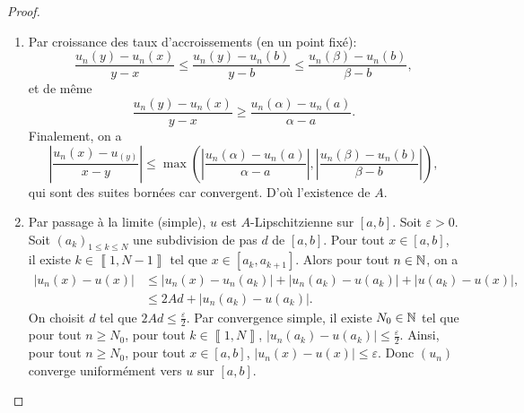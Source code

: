 \documentclass[12pt]{article}
\begin{document}
\begin{proof}
    \phantom{}
    \begin{enumerate}
        \item Par croissance des taux d'accroissements (en un point fixé):
        \begin{equation*}
            \frac{u_n(y)-u_n(x)}{y-x}\leqslant\frac{u_n(y)-u_n(b)}{y-b}\leqslant\frac{u_n(\beta)-u_n(b)}{\beta-b},
        \end{equation*}
        et de même
        \begin{equation*}
            \frac{u_n(y)-u_n(x)}{y-x}\geqslant\frac{u_n(\alpha)-u_n(a)}{\alpha-a}.
        \end{equation*}
        Finalement, on a 
        \begin{equation*}
            \left\lvert\frac{u_n(x)-u_(y)}{x-y}\right\rvert\leqslant\max\left(\left\lvert\frac{u_n(\alpha)-u_n(a)}{\alpha-a}\right\rvert,\left\lvert\frac{u_n(\beta)-u_n(b)}{\beta-b}\right\rvert\right),
        \end{equation*}
        qui sont des suites bornées car convergent. D'où l'existence de $A$.

        \item Par passage à la limite (simple), $u$ est $A$-Lipschitzienne sur $[a,b]$. Soit $\varepsilon>0$. Soit $(a_{k})_{1\leqslant k\leqslant N}$ une subdivision de pas $d$ de $[a,b]$. Pour tout $x\in[a,b]$, il existe $k\in\left\llbracket1,N-1\right\rrbracket$ tel que $x\in[a_{k},a_{k+1}]$.
        Alors pour tout $n\in\mathbb{N}$, on a 
        \begin{align*}
            \left\lvert u_n(x)-u(x)\right\rvert
            &\leqslant\left\lvert u_n(x)-u_n(a_k)\right\rvert+\left\lvert u_n(a_k)-u(a_k)\right\rvert+\left\lvert u(a_k)-u(x)\right\rvert,\\
            &\leqslant2Ad+\left\lvert u_n(a_k)-u(a_k)\right\rvert.
        \end{align*}
        On choisit $d$ tel que $2Ad\leqslant\frac{\varepsilon}{2}$. Par convergence simple, il existe $N_{0}\in\mathbb{N}$ tel que pour tout $n\geqslant N_{0}$, pour tout $k\in\left\llbracket1,N\right\rrbracket$, $\left\lvert u_n(a_k)-u(a_k)\right\rvert\leqslant\frac{\varepsilon}{2}$. Ainsi, pour tout $n\geqslant N_{0}$, pour tout $x\in[a,b]$, $\left\lvert u_n(x)-u(x)\right\rvert\leqslant\varepsilon$. Donc $(u_n)$ converge uniformément vers $u$ sur $[a,b]$.
    \end{enumerate}
\end{proof}
\end{document}
